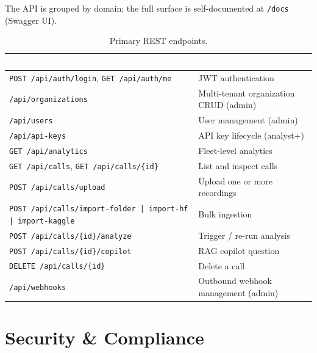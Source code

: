\documentclass[11pt,a4paper]{article}
\begin{document}
The API is grouped by domain; the full surface is self-documented at
\texttt{/docs} (Swagger UI).

\begin{table}[htbp]
  \centering
  \small
  \begin{tabular}{@{}p{52mm}p{94mm}@{}}
    \toprule
    \rowcolor{tablehead}
    \textcolor{white}{\textbf{Endpoint}} & \textcolor{white}{\textbf{Purpose}} \\
    \midrule
    \texttt{POST /api/auth/login}, \texttt{GET /api/auth/me} & JWT authentication \\
    \texttt{/api/organizations} & Multi-tenant organization CRUD (admin) \\
    \texttt{/api/users} & User management (admin) \\
    \texttt{/api/api-keys} & API key lifecycle (analyst+) \\
    \texttt{GET /api/analytics} & Fleet-level analytics \\
    \texttt{GET /api/calls}, \texttt{GET /api/calls/\{id\}} & List and inspect calls \\
    \texttt{POST /api/calls/upload} & Upload one or more recordings \\
    \texttt{POST /api/calls/import-folder | import-hf | import-kaggle} & Bulk ingestion \\
    \texttt{POST /api/calls/\{id\}/analyze} & Trigger / re-run analysis \\
    \texttt{POST /api/calls/\{id\}/copilot} & RAG copilot question \\
    \texttt{DELETE /api/calls/\{id\}} & Delete a call \\
    \texttt{/api/webhooks} & Outbound webhook management (admin) \\
    \bottomrule
  \end{tabular}
  \caption{Primary REST endpoints.}
\end{table}

\section{Security \& Compliance}
\end{document}
